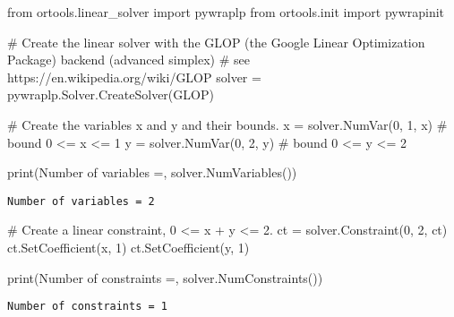 \documentclass[
  ignorenonframetext,
]{beamer}
\newenvironment{Shaded}{\begin{snugshade}}{\end{snugshade}}
\newcommand{\BuiltInTok}[1]{\textcolor[rgb]{0.00,0.23,0.31}{#1}}
\newcommand{\CommentTok}[1]{\textcolor[rgb]{0.37,0.37,0.37}{#1}}
\newcommand{\DecValTok}[1]{\textcolor[rgb]{0.68,0.00,0.00}{#1}}
\newcommand{\ImportTok}[1]{\textcolor[rgb]{0.00,0.46,0.62}{#1}}
\newcommand{\NormalTok}[1]{\textcolor[rgb]{0.00,0.23,0.31}{#1}}
\newcommand{\OperatorTok}[1]{\textcolor[rgb]{0.37,0.37,0.37}{#1}}
\newcommand{\StringTok}[1]{\textcolor[rgb]{0.13,0.47,0.30}{#1}}
\begin{document}
\begin{frame}[fragile]
\begin{Shaded}
\begin{Highlighting}[]
\ImportTok{from}\NormalTok{ ortools.linear\_solver }\ImportTok{import}\NormalTok{ pywraplp}
\ImportTok{from}\NormalTok{ ortools.init }\ImportTok{import}\NormalTok{ pywrapinit}

\CommentTok{\# Create the linear solver with the GLOP (the Google Linear Optimization Package) backend (advanced simplex)}
\CommentTok{\# see https://en.wikipedia.org/wiki/GLOP}
\NormalTok{solver }\OperatorTok{=}\NormalTok{ pywraplp.Solver.CreateSolver(}\StringTok{\textquotesingle{}GLOP\textquotesingle{}}\NormalTok{)}
\end{Highlighting}
\end{Shaded}

\pause

\begin{Shaded}
\begin{Highlighting}[]
\CommentTok{\# Create the variables x and y and their bounds.}
\NormalTok{x }\OperatorTok{=}\NormalTok{ solver.NumVar(}\DecValTok{0}\NormalTok{, }\DecValTok{1}\NormalTok{, }\StringTok{\textquotesingle{}x\textquotesingle{}}\NormalTok{)   }\CommentTok{\# bound 0 \textless{}= x \textless{}= 1}
\NormalTok{y }\OperatorTok{=}\NormalTok{ solver.NumVar(}\DecValTok{0}\NormalTok{, }\DecValTok{2}\NormalTok{, }\StringTok{\textquotesingle{}y\textquotesingle{}}\NormalTok{)   }\CommentTok{\# bound 0 \textless{}= y \textless{}= 2}

\BuiltInTok{print}\NormalTok{(}\StringTok{\textquotesingle{}Number of variables =\textquotesingle{}}\NormalTok{, solver.NumVariables())}
\end{Highlighting}
\end{Shaded}

\begin{verbatim}
Number of variables = 2
\end{verbatim}

\pause

\begin{Shaded}
\begin{Highlighting}[]
\CommentTok{\# Create a linear constraint, 0 \textless{}= x + y \textless{}= 2.}
\NormalTok{ct }\OperatorTok{=}\NormalTok{ solver.Constraint(}\DecValTok{0}\NormalTok{, }\DecValTok{2}\NormalTok{, }\StringTok{\textquotesingle{}ct\textquotesingle{}}\NormalTok{)}
\NormalTok{ct.SetCoefficient(x, }\DecValTok{1}\NormalTok{)}
\NormalTok{ct.SetCoefficient(y, }\DecValTok{1}\NormalTok{)}

\BuiltInTok{print}\NormalTok{(}\StringTok{\textquotesingle{}Number of constraints =\textquotesingle{}}\NormalTok{, solver.NumConstraints())}
\end{Highlighting}
\end{Shaded}

\begin{verbatim}
Number of constraints = 1
\end{verbatim}
\end{frame}
\end{document}
